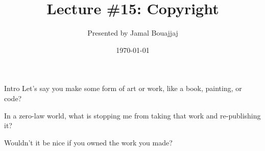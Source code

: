 %
%



\usepackage{media9}
\usepackage{multicol}

\title{Lecture \#15: Copyright}
\date{\today}
\author{Presented by Jamal Bouajjaj}

\makeatletter
{}%
\makeatother



\maketitle

\begin{frame}{Intro}
  Let's say you make some form of art or work, like a book, painting, or code?\pause

  In a zero-law world, what is stopping me from taking that work and re-publishing it? \pause

  Wouldn't it be nice if you owned the work you made?
\end{frame}

